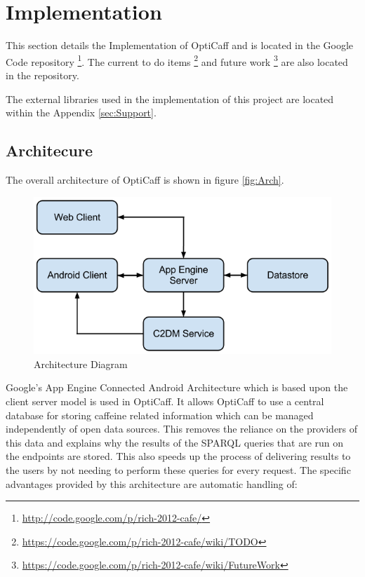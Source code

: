 \section{Implementation}

This section details the Implementation of OptiCaff and is located in the Google Code repository \footnote{\url{http://code.google.com/p/rich-2012-cafe/}}. The current to do items \footnote{\url{https://code.google.com/p/rich-2012-cafe/wiki/TODO}} and future work \footnote{\url{https://code.google.com/p/rich-2012-cafe/wiki/FutureWork}} are also located in the repository.

The external libraries used in the implementation of this project are located within the Appendix \ref{sec:Support}.

\subsection{Architecure}

The overall architecture of OptiCaff is shown in figure \ref{fig:Arch}.

\begin{figure}[ht]
\begin{center}
\includegraphics[trim = 0mm 0mm 0mm 0mm, clip, scale=0.4]{images/Architecture.png}
\caption{Architecture Diagram \cite{AppEngine}} 
\end{center}
\end{figure}

Google’s App Engine Connected Android Architecture \cite{AppEngine} which is based upon the client server model is used in OptiCaff. It allows OptiCaff to use a central database for storing caffeine related information which can be managed independently of open data sources. This removes the reliance on the providers of this data and explains why the results of the SPARQL queries that are run on the endpoints are stored. This also speeds up the process of delivering results to the users by not needing to perform these queries for every request. The specific advantages provided by this architecture are automatic handling of:

